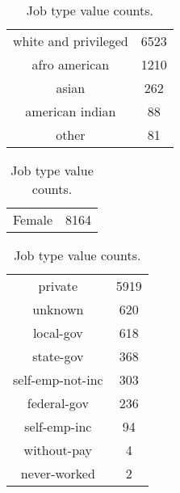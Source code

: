 \begin{table}[!h]
\begin{minipage}{.5\textwidth}
    \caption{Ethnicity value counts.}
    \label{tab:ethnicity_value_counts}
    \centering
    \begin{tabular}{cc}
        white and privileged & 6523 \\
        afro american & 1210 \\
        asian & 262 \\
        american indian & 88 \\
        other & 81 \\
    \end{tabular}
\vspace{5mm}
    \caption{Gender value counts.}
    \label{tab:gender_value_counts}
    \centering
    \begin{tabular}{cc}
        Female & 8164 \\
    \end{tabular}
\end{minipage}
\begin{minipage}{.5\textwidth}
    \caption{Job type value counts.}
    \label{tab:job_type_value_counts}
    \centering
    \begin{tabular}{cc}
        private & 5919 \\
        unknown & 620 \\
        local-gov & 618 \\
        state-gov & 368 \\
        self-emp-not-inc & 303 \\
        federal-gov & 236 \\
        self-emp-inc & 94 \\
        without-pay & 4 \\
        never-worked & 2 \\
    \end{tabular}
\end{minipage}
\end{table}

